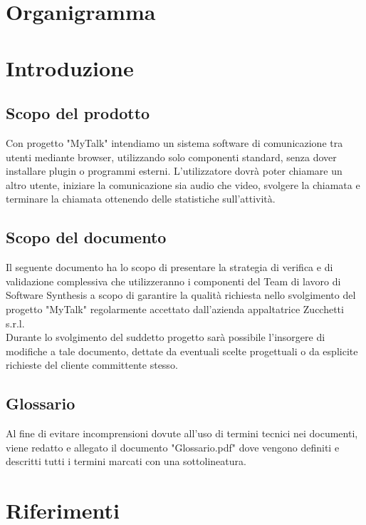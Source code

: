 

\setcounter{page}{1}
\pagestyle{normal}

\section{Organigramma}

\section{Introduzione}
\subsection{Scopo del prodotto}
Con progetto "MyTalk" intendiamo un sistema software di comunicazione tra utenti mediante browser, utilizzando solo componenti standard, senza dover installare plugin o programmi esterni. L'utilizzatore dovrà poter chiamare un altro utente, iniziare la comunicazione sia audio che video, svolgere la chiamata e terminare la chiamata ottenendo delle statistiche sull'attività.

\subsection{Scopo del documento}
Il seguente documento ha lo scopo di presentare la strategia di verifica e di validazione complessiva che utilizzeranno i componenti del Team di lavoro di Software Synthesis a scopo di garantire la qualità richiesta nello svolgimento del progetto "MyTalk" regolarmente accettato dall'azienda appaltatrice Zucchetti s.r.l.\\
Durante lo svolgimento del suddetto progetto sarà possibile l'insorgere di modifiche a tale documento, dettate da eventuali scelte progettuali o da esplicite richieste del cliente committente stesso.
\subsection{Glossario}
Al fine di evitare incomprensioni dovute all'uso di termini tecnici nei documenti, viene redatto e allegato il documento "Glossario.pdf" dove vengono definiti e descritti tutti i termini marcati con una sottolineatura.

\section{Riferimenti}
